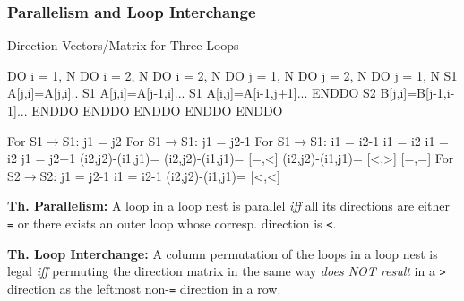 \documentclass{beamer}
\newcommand{\emp}[1]{\textcolor{DikuRed}{ #1}}
\newcommand{\mymath}[1]{$ #1 $}
\begin{document}
\begin{frame}[fragile,t]
  \frametitle{Parallelism and Loop Interchange} %

\begin{block}{Direction Vectors/Matrix for Three Loops }
\begin{colorcode}
  DO i = 1, N            DO i = 2, N               DO i = 2, N
    DO j = 1, N            DO j = 2, N               DO j = 1, N 
S1    A[j,i]=A[j,i]..  S1   A[j,i]=A[j-1,i]...   S1    A[i,j]=A[i-1,j+1]...
    ENDDO              S2   B[j,i]=B[j-1,i-1]...     ENDDO
  ENDDO                  ENDDO ENDDO               ENDDO

For S1\mymath{\rightarrow}S1: j1 = j2    For S1\mymath{\rightarrow}S1: j1 = j2-1          For S1\mymath{\rightarrow}S1: i1 = i2-1
            i1 = i2                i1 = i2                        j1 = j2+1
(i2,j2)-(i1,j1)=         (i2,j2)-(i1,j1)=\emp{[=,<]}        (i2,j2)-(i1,j1)=\emp{[<,>]}
\emp{[=,=]}                  For S2\mymath{\rightarrow}S2: j1 = j2-1
                                   i1 = i2-1
                         (i2,j2)-(i1,j1)=\emp{[<,<]}
\end{colorcode}
\end{block} 

{\bf Th. Parallelism:} A loop in a loop nest is parallel {\em iff} all its directions
are either {\tt =} or there exists an outer loop whose corresp. direction is {\tt <}. 

\smallskip

{\bf Th. Loop Interchange:} A column permutation of the loops in a loop nest 
is legal {\em iff} permuting the direction matrix in the same way {\em does NOT result}
in a {\tt >} direction as the leftmost non-{\tt{}=} direction in a row. 


\end{frame}
\end{document}
